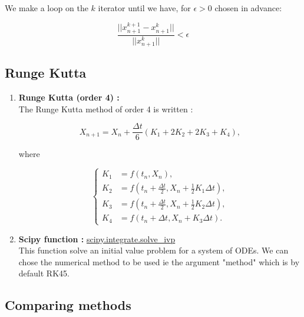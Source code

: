 \documentclass[12pt]{article}
\begin{document}
	\noindent We make a loop on the $k$ iterator until we have, for $\epsilon>0$ chosen in advance:
	
	$$\frac{||x_{n+1}^{k+1}-x_{n+1}^k||}{||x_{n+1}^k||}<\epsilon$$
	
	\subsection{Runge Kutta}
	
	\begin{enumerate}[label=\textbullet]
		\item \textbf{Runge Kutta (order 4) :} \\
		The Runge Kutta method of order 4 is written :
		
		$$X_{n+1}=X_n+\frac{\Delta t}{6}\left(K_1+2K_2+2K_3+K_4\right) ,$$
		
		\noindent where 
		
		$$\left\{\begin{aligned}
			K_1&=f(t_n,X_n) , \\
			K_2&=f\left(t_n+\frac{\Delta t}{2},X_n+\frac{1}{2} K_1\Delta t\right) , \\
			K_3&=f\left(t_n+\frac{\Delta t}{2},X_n+\frac{1}{2} K_2\Delta t\right) , \\
			K_4&=f\left(t_n+\Delta t,X_n+K_3\Delta t\right) .
		\end{aligned}\right.$$
		\item \textbf{Scipy function :} \href{https://docs.scipy.org/doc/scipy/reference/generated/scipy.integrate.solve_ivp.html#scipy.integrate.solve_ivp}{scipy.integrate.solve\_ivp} \\
		This function solve an initial value problem for a system of ODEs. We can chose the numerical method to be used ie the argument "method" which is by default RK45. 
	\end{enumerate}
	
	\subsection{Comparing methods}
	
\end{document}
